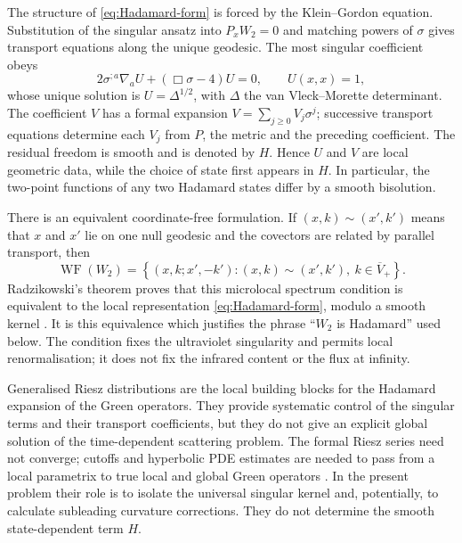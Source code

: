\documentclass[11pt,a4paper]{article}
\theoremstyle{definition}
\theoremstyle{remark}
\newcommand{\WF}{\operatorname{WF}}
\begin{document}
	The structure of \eqref{eq:Hadamard-form} is forced by the Klein--Gordon
	equation.  Substitution of the singular ansatz into $P_xW_2=0$ and matching
	powers of $\sigma$ gives transport equations along the unique geodesic.  The
	most singular coefficient obeys
	\begin{equation}
		2\sigma^{;a}\nabla_aU+(\Box\sigma-4)U=0,
		\qquad U(x,x)=1,
		\label{eq:U-transport}
	\end{equation}
	whose unique solution is $U=\Delta^{1/2}$, with $\Delta$ the van Vleck--Morette
	determinant.  The coefficient $V$ has a formal expansion
	$V=\sum_{j\geq0}V_j\sigma^j$; successive transport equations determine each
	$V_j$ from $P$, the metric and the preceding coefficient.  The residual
	freedom is smooth and is denoted by $H$.  Hence $U$ and $V$ are local geometric
	data, while the choice of state first appears in $H$.  In particular, the
	two-point functions of any two Hadamard states differ by a smooth bisolution.
	
	There is an equivalent coordinate-free formulation.  If $(x,k)\sim(x',k')$
	means that $x$ and $x'$ lie on one null geodesic and the covectors are related
	by parallel transport, then
	\begin{equation}
		\WF(W_2)=
		\left\{(x,k;x',-k'):(x,k)\sim(x',k'),\ k\in\overline V_+\right\}.
		\label{eq:microlocal-spectrum}
	\end{equation}
	Radzikowski's theorem proves that this microlocal spectrum condition is
	equivalent to the local representation \eqref{eq:Hadamard-form}, modulo a
	smooth kernel \cite{Radzikowski1996}.  It is this equivalence which justifies
	the phrase ``$W_2$ is Hadamard'' used below.  The condition fixes the
	ultraviolet singularity and permits local renormalisation; it does not fix
	the infrared content or the flux at infinity.
	
	Generalised Riesz distributions are the local building blocks for the
	Hadamard expansion of the Green operators.  They provide systematic control
	of the singular terms and their transport coefficients, but they do not give
	an explicit global solution of the time-dependent scattering problem.  The
	formal Riesz series need not converge; cutoffs and hyperbolic PDE estimates
	are needed to pass from a local parametrix to true local and global Green
	operators \cite{BaerGinouxPfaeffle2007}.  In the present problem their role is
	to isolate the universal singular kernel and, potentially, to calculate
	subleading curvature corrections.  They do not determine the smooth
	state-dependent term $H$.
	
\end{document}
